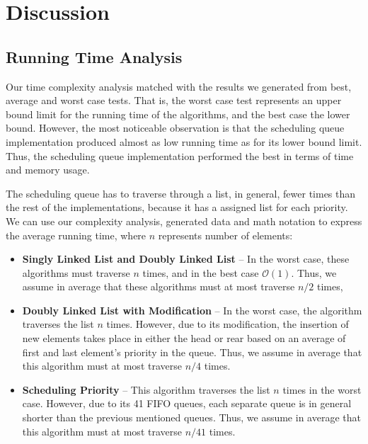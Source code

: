 \documentclass[a4paper,11pt]{kth-mag}
\newcommand*{\skippara}{\par\vspace{\baselineskip} \noindent}
\begin{document}
\section{Discussion}

\subsection{Running Time Analysis}\label{sec:rtanal}
Our time complexity analysis matched with the results we generated from best, average and worst case tests.
That is, the worst case test represents an upper bound limit for the running time of the algorithms, and the best case the lower bound.
However, the most noticeable observation is that the scheduling queue implementation produced almost as low running time as for its lower bound limit.
Thus, the scheduling queue implementation performed the best in terms of time and memory usage.

\skippara The scheduling queue has to traverse through a list, in general, fewer times than the rest of the implementations, because it has a assigned list for each priority.
We can use our complexity analysis, generated data and math notation to express the average running time, where $n$ represents number of elements:
\begin{itemize}
\item \textbf{Singly Linked List and Doubly Linked List} -- In the worst case, these algorithms must traverse $n$ times, and in the best case $\mathcal{O}(1)$.
        Thus, we assume in average that these algorithms must at most traverse $n/2$ times,
    \item \textbf{Doubly Linked List with Modification} -- In the worst case, the algorithm traverses the list $n$ times.
        However, due to its modification, the insertion of new elements takes place in either the head or rear based on an average of first and last element's priority in the queue.
        Thus, we assume in average that this algorithm must at most traverse $n/4$ times.
    \item \textbf{Scheduling Priority} -- This algorithm traverses the list $n$ times in the worst case.
        However, due to its 41 FIFO queues, each separate queue is in general shorter than the previous mentioned queues.
        Thus, we assume in average that this algorithm must at most traverse $n/41$ times.
\end{itemize}
\end{document}
